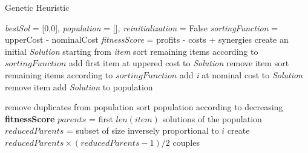 \documentclass{article}
\begin{document}
\begin{algorithm}[H]
\caption{Genetic Heuristic} \label{genetic}
\begin{algorithmic}[1]
\State \textsl{bestSol} = [0,0], \hspace{0.5cm} \textsl{population} = [], \hspace{0.5cm} \textsl{reinitialization} = False
\State \textsl{sortingFunction} = upperCost - nominalCost
\State \textsl{fitnessScore} = profits - costs + synergies
\State {\color{trolleygrey}{\#create population}}
    \State create an initial \textsl{Solution} starting from \textsl{item}
        \State sort remaining items according to $sortingFunction$ 
        \State add first item at uppered cost to \textsl{Solution}
            \State remove item
        \EndIf
    \EndWhile
    \State sort remaining items according to $sortingFunction$
        \State add \textsl{i} at nominal cost to \textsl{Solution}
            \State remove item
        \EndIf
    \EndFor
     \State add \textsl{Solution} to population
\EndFor

 

\State {\color{trolleygrey}{\#main procedure}}
    \State {\color{trolleygrey}{\#parents selection}}
    \State  remove duplicates from population
    \State  sort population according to decreasing \textbf{fitnessScore}
    \State  $parents$ = first $len(item)$ solutions of the population
    \State  $reducedParents$ = subset of size inversely proportional to $i$
    \State  create $reducedParents\times(reducedParents-1)/2$  couples
    
    \end{algorithmic}
    \label{model_gen}
    \end{algorithm}
\end{document}

